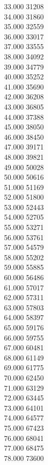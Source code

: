 { 33.000	31208 \\
 34.000	31860 \\
 35.000	32559 \\
 36.000	33017 \\
 37.000	33555 \\
 38.000	34092 \\
 39.000	34779 \\
 40.000	35252 \\
 41.000	35690 \\
 42.000	36208 \\
 43.000	36805 \\
 44.000	37388 \\
 45.000	38050 \\
 46.000	38450 \\
 47.000	39171 \\
 48.000	39821 \\
 49.000	50028 \\
 50.000	50616 \\
 51.000	51169 \\
 52.000	51800 \\
 53.000	52443 \\
 54.000	52705 \\
 55.000	53271 \\
 56.000	53761 \\
 57.000	54579 \\
 58.000	55202 \\
 59.000	55885 \\
 60.000	56486 \\
 61.000	57017 \\
 62.000	57311 \\
 63.000	57803 \\
 64.000	58397 \\
 65.000	59176 \\
 66.000	59755 \\
 67.000	60481 \\
 68.000	61149 \\
 69.000	61775 \\
 70.000	62450 \\
 71.000	63129 \\
 72.000	63445 \\
 73.000	64101 \\
 74.000	64577 \\
 75.000	67423 \\
 76.000	68041 \\
 77.000	68475 \\
 78.000	73600 \\
}
